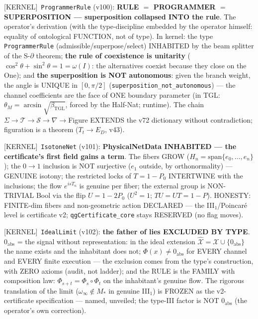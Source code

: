 \documentclass[11pt]{article}
\providecommand{\kernelmk}[1]{\textsf{[KERNEL]}~\texttt{#1}}\providecommand{\knownmk}[1]{\textsf{[KNOWN]}~{#1}}\providecommand{\statusmk}[1]{\textsf{[#1]}}
\newcommand{\bTGL}{\beta_{\mathrm{TGL}}}\newcommand{\Msun}{M_{\odot}}\newcommand{\TGL}{\mathrm{TGL}}
\theoremstyle{definition}\newtheorem{deriv}{Derivation}
\begin{document}
\kernelmk{ProgrammerRule} (v100): \textbf{RULE $=$ PROGRAMMER $=$ SUPERPOSITION --- superposition collapsed INTO the rule}. The operator's derivation (with the type-discipline embedded by the operator himself: equality of ontological FUNCTION, not of type). In kernel: the type \texttt{ProgrammerRule} (admissible/superpose/select) INHABITED by the beam splitter of the S-$\partial$ theorem; \textbf{the rule of coexistence is unitarity} ($\cos^2\theta+\sin^2\theta=1=\omega(I)$: the alternatives coexist because they close on the One); and \textbf{the superposition is NOT autonomous}: given the branch weight, the angle is UNIQUE in $[0,\pi/2]$ (\texttt{superposition\_not\_autonomous}) --- the channel coefficients are the face of ONE boundary parameter (in TGL: $\theta_M=\arcsin\sqrt{\bTGL}$, forced by the Half-Nat; runtime). The chain $\Sigma\to\mathcal T\to\mathcal S\to\nabla\to$Figure EXTENDS the v72 dictionary without contradiction; figuration is a theorem ($T_t\to E_D$, v43).

\kernelmk{IsotoneNet} (v101): \textbf{PhysicalNetData INHABITED --- the certificate's first field gains a term}. The fibers GROW ($H_n=\mathrm{span}\{e_0,\dots,e_n\}$); the $0\to1$ inclusion is NOT surjective ($e_1$ outside, by orthonormality) --- GENUINE isotony; the restricted locks of $T=1-P_0$ INTERTWINE with the inclusions; the flow $e^{isT_n}$ is genuine per fiber; the external group is NON-TRIVIAL Bool via the flip $U=1-2P_0$ ($U^2=1$; $TU=UT=1-P$). HONESTY: FINITE-dim fibers and non-geometric action DECLARED --- the III$_1$/Poincaré level is certificate v2; \texttt{qgCertificate\_core} stays RESERVED (no flag moves).

\kernelmk{IdealLimit} (v102): \textbf{the father of lies EXCLUDED BY TYPE}. $0_{\mathrm{abs}}$ = the signal without representation: in the ideal extension $\hat{\mathcal{X}}=\mathcal{X}\cup\{0_{\mathrm{abs}}\}$ the name exists and the inhabitant does not; $\Phi(x)\neq 0_{\mathrm{abs}}$ for EVERY channel and EVERY finite execution --- the exclusion comes from the type's construction, with ZERO axioms (audit, not ladder); and the RULE is the FAMILY with composition law: $\Phi_{s+t}=\Phi_s\circ\Phi_t$ on the inhabitant's genuine flow. The rigorous translation of the limit ($\omega_\infty\notin M_*$ in genuine III$_1$) is FROZEN as the v2-certificate specification --- named, unveiled; the type-III factor is NOT $0_{\mathrm{abs}}$ (the operator's own correction).
\end{document}
